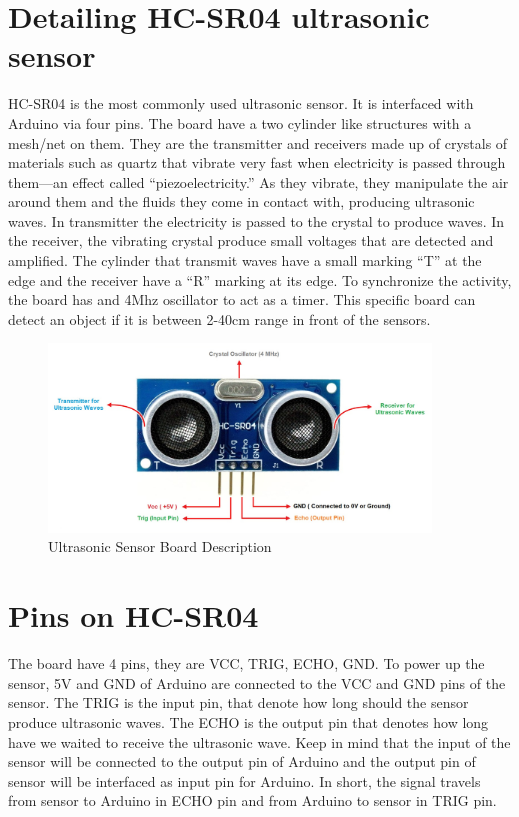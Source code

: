 \section{Detailing HC-SR04 ultrasonic sensor}
HC-SR04 is the most commonly used ultrasonic sensor. It is interfaced with Arduino via four pins. The board have a two cylinder like structures with a mesh/net on them. They are the transmitter and receivers made up of crystals of materials such as quartz that vibrate very fast when electricity is passed through them—an effect called “piezoelectricity.” As they vibrate, they manipulate the air around them and the fluids they come in contact with, producing ultrasonic waves. In transmitter the electricity is passed to the crystal to produce waves. In the receiver, the vibrating crystal produce small voltages that are detected and amplified. The cylinder that transmit waves have a small marking “T” at the edge and the receiver have a “R” marking at its edge. To synchronize the activity, the board has and 4Mhz oscillator to act as a timer. This specific board can detect an object if it is between 2-40cm range in front of the sensors.\\
\vspace{1cm}
\hspace{2cm}
\begin{figure}[h!]	
	\centering
	\includegraphics[width=4in]{Chapters/images/ultraSonic_desp.png}
	\caption{Ultrasonic Sensor Board Description}
\end{figure}
\hspace{2cm}
\section{Pins on HC-SR04}
The board have 4 pins, they are VCC, TRIG, ECHO, GND. To power up the sensor, 5V and GND of Arduino are connected to the VCC and GND pins of the sensor. The TRIG is the input pin, that denote how long should the sensor produce ultrasonic waves. The ECHO is the output pin that denotes how long have we waited to receive the ultrasonic wave. Keep in mind that the input of the sensor will be connected to the output pin of Arduino and the output pin of sensor will be interfaced as input pin for Arduino. In short, the signal travels from sensor to Arduino in ECHO pin and from Arduino to sensor in TRIG pin.
\\

